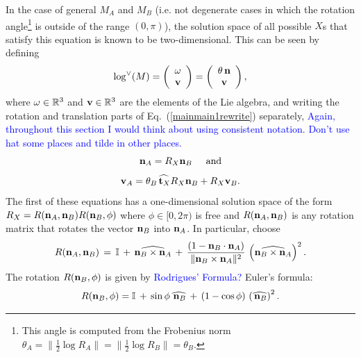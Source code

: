 \documentclass[twocolumn,10pt]{asme2ej}
\newcommand{\II}{\mathbb{I}}
\newcommand{\half}{\frac{1}{2}}
\begin{document}
In the case of general $M_A$ and $M_B$ (i.e. not degenerate cases in which the rotation angle\footnote{This angle is computed from the Frobenius norm $\theta_A =\|\half \log R_A\| = \|\half \log R_B\|= \theta_B$.} is outside of the range
$(0,\pi)$), the solution space of all possible $X$s that satisfy this equation is known to be two-dimensional.
This can be seen by defining
$$ \log^{\vee}(M) = \left(\begin{array}{c}
\omega \\
{\bf v} \end{array} \right)
=\left(\begin{array}{c}
\theta \, {\bf n} \\
{\bf v} \end{array} \right), $$
where ${\bf \omega} \in \mathbb{R}^3$ and ${\bf v} \in \mathbb{R}^3$ are the elements of the Lie algebra, and writing the rotation and translation parts of Eq.~(\ref{mainmain1rewrite}) separately,
\textcolor{blue}{Again, throughout this section I would think about using consistent notation. Don't use hat some places and tilde in other places.}
\begin{equation}
{\bf n}_A = R_X {\bf n}_B \hspace{5mm}\mbox{and}
\label{nanb} \end{equation}
\begin{equation}
{\bf v}_A = \theta_B \widehat{\,{\bf t}_X} R_X {\bf n}_B + R_X {\bf v}_B.
\label{vavb} \end{equation}
The first of these equations has a one-dimensional solution space of the form
$R_X = R({\bf n}_A, {\bf n}_B) R({\bf n}_B, \phi)$ where $\phi \in [0,2\pi)$ is free and
$R({\bf n}_A, {\bf n}_B)$ is any rotation matrix that rotates the vector ${\bf n}_B$ into ${\bf n}_A$.
In particular, choose
\begin{equation}
R({\bf n}_A, {\bf n}_B)  \,=\,
\II \,+\, \widehat{{\bf n}_B \times {\bf n}_A}
\,+\, \frac{(1- {\bf n}_B \cdot {\bf n}_A)}{\|{\bf n}_B \times {\bf n}_A\|^2} \, \left(\widehat{{\bf n}_B \times {\bf n}_A}\right)^2.
\label{transab}
\end{equation}
The rotation $R({\bf n}_B, \phi)$ is given by \textcolor{blue}{Rodrigues' Formula?} Euler's formula:
$$ R({\bf n}_B, \phi) = \II \,+\, \sin \phi \, \widehat{\,{\bf n}_B} \,+\, (1-\cos \phi)\, \left(\widehat{\,{\bf n}_B}\right)^2. $$
\end{document}

